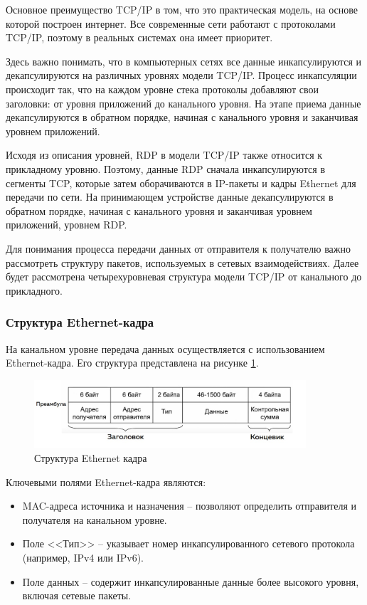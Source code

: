 \documentclass[bachelor, och, coursework]{SCWorks}
\begin{document}
Основное преимущество TCP/IP в том, что это практическая модель, на основе которой построен интернет. Все современные сети работают 
с протоколами TCP/IP, поэтому в реальных системах она имеет приоритет.

Здесь важно понимать, что в компьютерных сетях все данные инкапсулируются и декапсулируются на различных уровнях модели TCP/IP.
Процесс инкапсуляции происходит так, что на каждом уровне стека 
протоколы добавляют свои заголовки: от уровня приложений до канального уровня. На этапе приема данные декапсулируются в обратном порядке, начиная 
с канального уровня и заканчивая уровнем приложений. 

Исходя из описания уровней, RDP в модели TCP/IP также относится к прикладному уровню. Поэтому, данные RDP сначала инкапсулируются в сегменты TCP, 
которые затем оборачиваются в IP-пакеты и кадры Ethernet для передачи по сети. На принимающем устройстве данные декапсулируются в обратном 
порядке, начиная с канального уровня и заканчивая уровнем приложений, уровнем RDP.

Для понимания процесса передачи данных от отправителя к получателю важно рассмотреть структуру пакетов, используемых в сетевых взаимодействиях. Далее
будет рассмотрена четырехуровневая структура модели TCP/IP от канального до прикладного. 


\subsubsection{Структура Ethernet-кадра}

На канальном уровне передача данных осуществляется с использованием Ethernet-кадра. Его структура представлена на рисунке \ref{eth-frame}.

\begin{figure}[H]
  \centering
  \includegraphics[width=0.9\textwidth]{pics/eth-frame.jpg}
  \caption{Структура Ethernet кадра}
  \label{eth-frame}
\end{figure}

Ключевыми полями Ethernet-кадра являются:

\begin{itemize}
  \item MAC-адреса источника и назначения -- позволяют определить отправителя и получателя на канальном уровне.
  \item Поле <<Тип>> -- указывает номер инкапсулированного сетевого протокола (например, IPv4 или IPv6).
  \item Поле данных -- содержит инкапсулированные данные более высокого уровня, включая сетевые пакеты.
\end{itemize}
\end{document}
